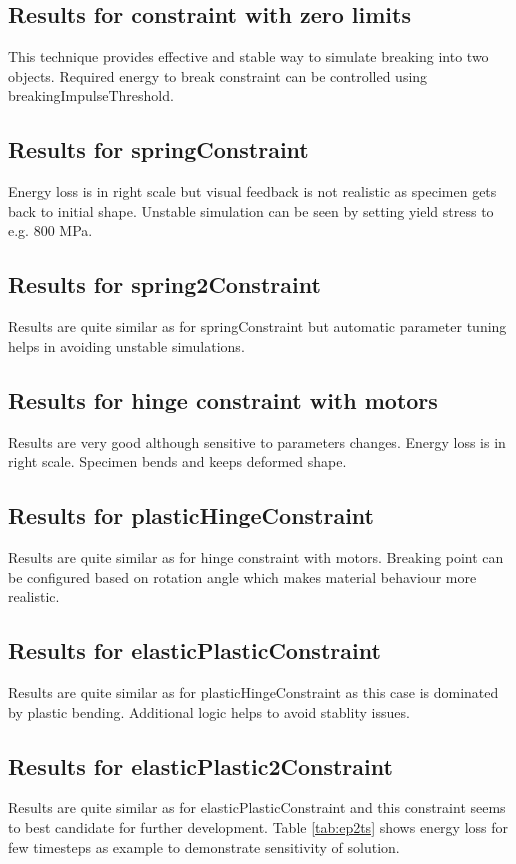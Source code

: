 \subsection{Results for constraint with zero limits}
This technique provides effective and stable way to simulate breaking into two objects. 
Required energy to break constraint can be controlled using
breakingImpulseThreshold. 

\subsection{Results for springConstraint}
Energy loss is in right scale but visual feedback is not realistic as specimen gets back to initial shape.
Unstable simulation can be seen by setting yield stress to e.g. 800 MPa.

\subsection{Results for spring2Constraint}
Results are quite similar as for springConstraint but automatic parameter tuning helps in avoiding unstable simulations.

\subsection{Results for hinge constraint with motors}
Results are very good although sensitive to parameters changes. Energy loss is in right scale. 
Specimen bends and keeps deformed shape.

\subsection{Results for plasticHingeConstraint}
Results are quite similar as for hinge constraint with motors. 
Breaking point can be configured based on rotation angle which makes material behaviour more realistic.

\subsection{Results for elasticPlasticConstraint}
Results are quite similar as for plasticHingeConstraint as this case is dominated by plastic bending.
Additional logic helps to avoid stablity issues.

\subsection{Results for elasticPlastic2Constraint}
Results are quite similar as for elasticPlasticConstraint and this constraint seems to best candidate for further development.
Table \ref{tab:ep2ts} shows energy loss for few timesteps as example to demonstrate sensitivity of solution.

